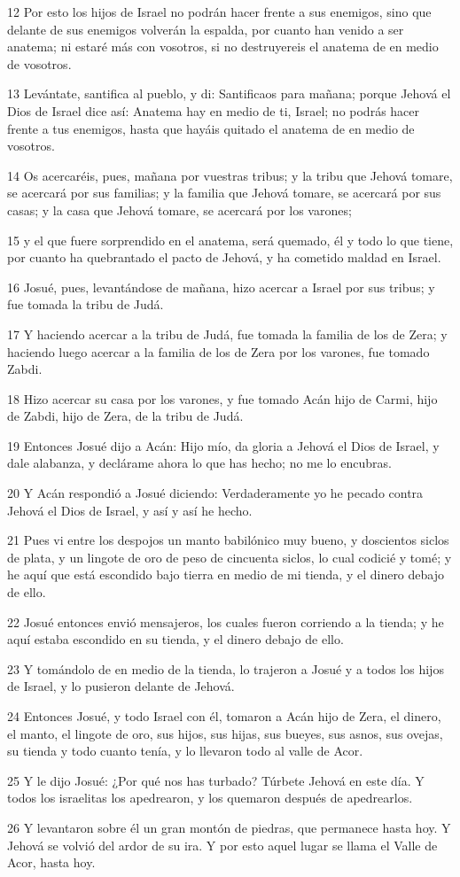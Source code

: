 \par 12 Por esto los hijos de Israel no podrán hacer frente a sus enemigos, sino que delante de sus enemigos volverán la espalda, por cuanto han venido a ser anatema; ni estaré más con vosotros, si no destruyereis el anatema de en medio de vosotros.
\par 13 Levántate, santifica al pueblo, y di: Santificaos para mañana; porque Jehová el Dios de Israel dice así: Anatema hay en medio de ti, Israel; no podrás hacer frente a tus enemigos, hasta que hayáis quitado el anatema de en medio de vosotros.
\par 14 Os acercaréis, pues, mañana por vuestras tribus; y la tribu que Jehová tomare, se acercará por sus familias; y la familia que Jehová tomare, se acercará por sus casas; y la casa que Jehová tomare, se acercará por los varones;
\par 15 y el que fuere sorprendido en el anatema, será quemado, él y todo lo que tiene, por cuanto ha quebrantado el pacto de Jehová, y ha cometido maldad en Israel.
\par 16 Josué, pues, levantándose de mañana, hizo acercar a Israel por sus tribus; y fue tomada la tribu de Judá.
\par 17 Y haciendo acercar a la tribu de Judá, fue tomada la familia de los de Zera; y haciendo luego acercar a la familia de los de Zera por los varones, fue tomado Zabdi.
\par 18 Hizo acercar su casa por los varones, y fue tomado Acán hijo de Carmi, hijo de Zabdi, hijo de Zera, de la tribu de Judá.
\par 19 Entonces Josué dijo a Acán: Hijo mío, da gloria a Jehová el Dios de Israel, y dale alabanza, y declárame ahora lo que has hecho; no me lo encubras.
\par 20 Y Acán respondió a Josué diciendo: Verdaderamente yo he pecado contra Jehová el Dios de Israel, y así y así he hecho.
\par 21 Pues vi entre los despojos un manto babilónico muy bueno, y doscientos siclos de plata,  y un lingote de oro de peso de cincuenta siclos, lo cual codicié y tomé; y he aquí que está escondido bajo tierra en medio de mi tienda, y el dinero debajo de ello.
\par 22 Josué entonces envió mensajeros, los cuales fueron corriendo a la tienda; y he aquí estaba escondido en su tienda, y el dinero debajo de ello.
\par 23 Y tomándolo de en medio de la tienda, lo trajeron a Josué y a todos los hijos de Israel, y lo pusieron delante de Jehová. 
\par 24 Entonces Josué, y todo Israel con él, tomaron a Acán hijo de Zera, el dinero, el manto, el lingote de oro, sus hijos, sus hijas, sus bueyes, sus asnos, sus ovejas, su tienda y todo cuanto tenía, y lo llevaron todo al valle de Acor.
\par 25 Y le dijo Josué: ¿Por qué nos has turbado? Túrbete Jehová en este día. Y todos los israelitas los apedrearon, y los quemaron después de apedrearlos.
\par 26 Y levantaron sobre él un gran montón de piedras, que permanece hasta hoy. Y Jehová se volvió del ardor de su ira. Y por esto aquel lugar se llama el Valle de Acor, hasta hoy.

